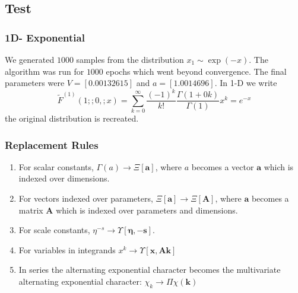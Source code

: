 \documentclass[journal=jcisd8,manuscript=article,layout=onecolumn,pdftex,floatfix,amsmath,amssymb,10pt]{achemso}
\begin{document}
\subsection{Test}
\subsubsection{1D- Exponential}
We generated $1000$ samples from the distribution $x_1 \sim \exp(-x)$. The algorithm was run for $1000$ epochs which went beyond convergence. The final parameters were $V = [0.00132615]$ and $a=[1.0014696]$. In 1-D we write \begin{equation}
\tilde{F}^{(1)}(1;;0,;x) = \sum_{k=0}^\infty \frac{(-1)^k}{k!} \frac{\Gamma(1+0k)}{\Gamma(1)} x^k = e^{-x}
\end{equation}
the original distribution is recreated.

\subsubsection{Replacement Rules}

\begin{enumerate}
\item For scalar constants, $\Gamma(a) \to \Xi[\mathbf{a}]$, where $a$ becomes a vector $\mathbf{a}$ which is indexed over dimensions.
\item For vectors indexed over parameters, $\Xi[\mathbf{a}] \to \Xi[\mathbf{A}]$, where $\mathbf{a}$ becomes a matrix $\mathbf{A}$ which is indexed over parameters and dimensions.
\item For scale constants, $\eta^{-s} \to \Upsilon[\mathbf{\boldsymbol\eta},-\mathbf{s}]$.
\item For variables in integrands $x^k \to \Upsilon[\mathbf{x}, \mathbf{Ak}]$
\item In series the alternating exponential character becomes the multivariate alternating exponential character: $\chi_k \to \Pi\chi(\mathbf{k})$
\end{enumerate}
\end{document}
